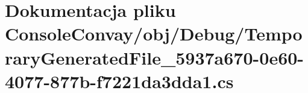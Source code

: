 \hypertarget{_console_convay_2obj_2_debug_2_temporary_generated_file__5937a670-0e60-4077-877b-f7221da3dda1_8cs}{}\section{Dokumentacja pliku Console\+Convay/obj/\+Debug/\+Temporary\+Generated\+File\+\_\+5937a670-\/0e60-\/4077-\/877b-\/f7221da3dda1.cs}
\label{_console_convay_2obj_2_debug_2_temporary_generated_file__5937a670-0e60-4077-877b-f7221da3dda1_8cs}
